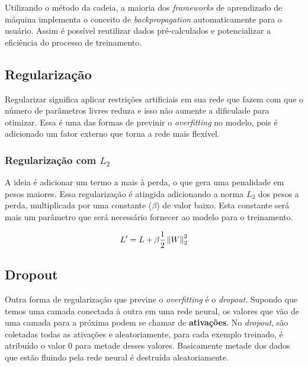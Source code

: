 Utilizando o método da cadeia, a maioria dos \textit{frameworks} de
aprendizado de máquina implementa o conceito de
\textit{backpropagation} automaticamente para o usuário. Assim é
possível reutilizar dados pré-calculados e potencializar a eficiência
do processo de treinamento.

\subsection{Regularização}

Regularizar significa aplicar restrições artificiais em sua rede que
fazem com que o número de parâmetros livres reduza e isso não aumente
a dificulade para otimizar. Essa é uma das formas de previnir o
\textit{overfitting} no modelo, pois é adicionado um fator externo
que torna a rede mais flexível.

\subsubsection{Regularização com $L_2$}

A ideia é adicionar um termo a mais à perda, o que gera uma penalidade
em pesos maiores. Essa regularização é atingida adicionando a norma $L_2$
\cite{Goodfellow-et-al-2016-Book} dos pesos a perda, multiplicada por
uma constante ($\beta$) de valor baixo. Esta constante será mais um
parâmetro que será necessário fornecer ao modelo para o treinamento.

\begin{equation}
L' = L + \beta\frac{1}{2} \left\lVert W\right\rVert_2^2
\end{equation}

\subsection{Dropout}

Outra forma de regularização que previne o \textit{overfitting} é o
\textit{dropout}\cite{Krizhevsky}. Supondo que temos uma camada
conectada à outra em uma rede neural, os valores que vão de uma camada
para a próxima podem se chamar de {\bf ativações}. No
\textit{dropout}, são coletadas todas as ativações e aleatoriamente,
para cada exemplo treinado, é atribuído o valor 0 para metade desses
valores. Basicamente metade dos dados que estão fluindo pela rede
neural é destruída aleatoriamente.

